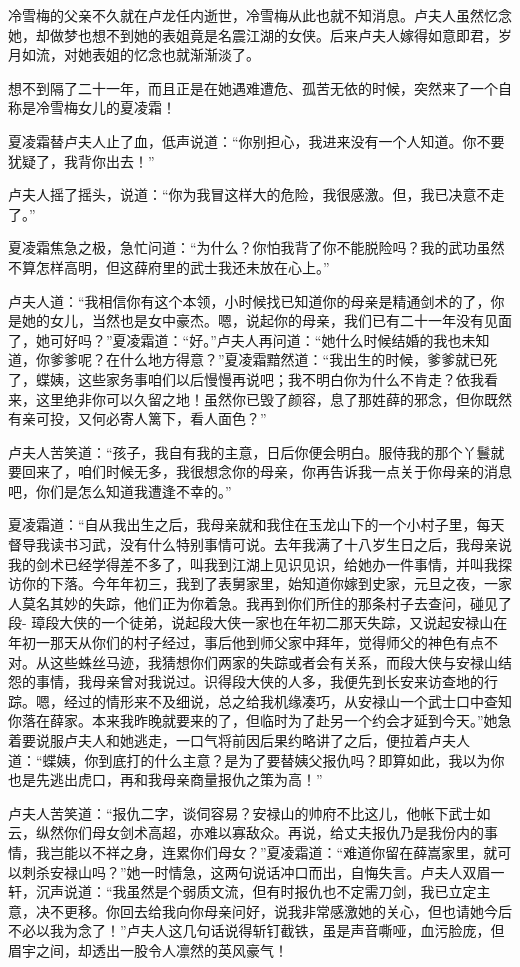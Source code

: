 \documentclass[12pt,oneside]{book}
\begin{document}
冷雪梅的父亲不久就在卢龙任内逝世，冷雪梅从此也就不知消息。卢夫人虽然忆念她，却做梦也想不到她的表姐竟是名震江湖的女侠。后来卢夫人嫁得如意即君，岁月如流，对她表姐的忆念也就渐渐淡了。

想不到隔了二十一年，而且正是在她遇难遭危、孤苦无依的时候，突然来了一个自称是冷雪梅女儿的夏凌霜！

夏凌霜替卢夫人止了血，低声说道：``你别担心，我进来没有一个人知道。你不要犹疑了，我背你出去！''

卢夫人摇了摇头，说道：``你为我冒这样大的危险，我很感激。但，我已决意不走了。''

夏凌霜焦急之极，急忙问道：``为什么？你怕我背了你不能脱险吗？我的武功虽然不算怎样高明，但这薛府里的武士我还未放在心上。''

卢夫人道：``我相信你有这个本领，小时候找已知道你的母亲是精通剑术的了，你是她的女儿，当然也是女中豪杰。嗯，说起你的母亲，我们已有二十一年没有见面了，她可好吗？''夏凌霜道：``好。''卢夫人再问道：``她什么时候结婚的我也未知道，你爹爹呢？在什么地方得意？''夏凌霜黯然道：``我出生的时候，爹爹就已死了，蝶姨，这些家务事咱们以后慢慢再说吧；我不明白你为什么不肯走？依我看来，这里绝非你可以久留之地！虽然你已毁了颜容，息了那姓薛的邪念，但你既然有亲可投，又何必寄人篱下，看人面色？''

卢夫人苦笑道：``孩子，我自有我的主意，日后你便会明白。服侍我的那个丫鬟就要回来了，咱们时候无多，我很想念你的母亲，你再告诉我一点关于你母亲的消息吧，你们是怎么知道我遭逢不幸的。''

夏凌霜道：``自从我出生之后，我母亲就和我住在玉龙山下的一个小村子里，每天督导我读书习武，没有什么特别事情可说。去年我满了十八岁生日之后，我母亲说我的剑术已经学得差不多了，叫我到江湖上见识见识，给她办一件事情，并叫我探访你的下落。今年年初三，我到了表舅家里，始知道你嫁到史家，元旦之夜，一家人莫名其妙的失踪，他们正为你着急。我再到你们所住的那条村子去查问，碰见了段-
璋段大侠的一个徒弟，说起段大侠一家也在年初二那天失踪，又说起安禄山在年初一那天从你们的村子经过，事后他到师父家中拜年，觉得师父的神色有点不对。从这些蛛丝马迹，我猜想你们两家的失踪或者会有关系，而段大侠与安禄山结怨的事情，我母亲曾对我说过。识得段大侠的人多，我便先到长安来访查地的行踪。嗯，经过的情形来不及细说，总之给我机缘凑巧，从安禄山一个武士口中查知你落在薛家。本来我昨晚就要来的了，但临时为了赴另一个约会才延到今天。''她急着要说服卢夫人和她逃走，一口气将前因后果约略讲了之后，便拉着卢夫人道：``蝶姨，你到底打的什么主意？是为了要替姨父报仇吗？即算如此，我以为你也是先逃出虎口，再和我母亲商量报仇之策为高！''

卢夫人苦笑道：``报仇二字，谈伺容易？安禄山的帅府不比这儿，他帐下武士如云，纵然你们母女剑术高超，亦难以寡敌众。再说，给丈夫报仇乃是我份内的事情，我岂能以不祥之身，连累你们母女？''夏凌霜道：``难道你留在薛嵩家里，就可以刺杀安禄山吗？''她一时情急，这两句说话冲口而出，自悔失言。卢夫人双眉一轩，沉声说道：``我虽然是个弱质文流，但有时报仇也不定需刀剑，我已立定主意，决不更移。你回去给我向你母亲问好，说我非常感激她的关心，但也请她今后不必以我为念了！''卢夫人这几句话说得斩钉截铁，虽是声音嘶哑，血污脸庞，但眉宇之间，却透出一股令人凛然的英风豪气！
\end{document}
